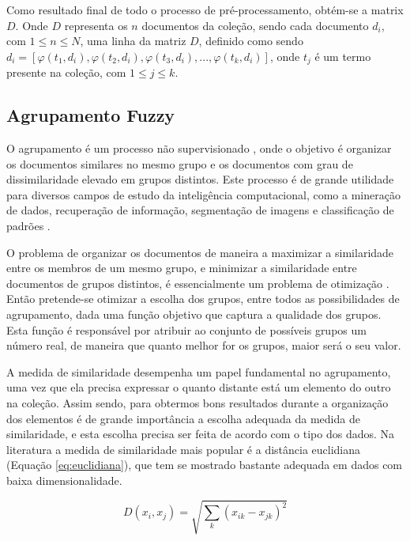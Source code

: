 Como resultado final de todo o processo de pré-processamento, obtém-se a matrix $D$. Onde $D$ 
representa os $n$ documentos da coleção, sendo cada documento $d_{i}$, com $1 \leq n \leq N$, 
uma linha da matriz $D$, definido como sendo 
$ d_{i} = [\varphi(t_{1},d_{i}),\varphi(t_{2},d_{i}),\varphi(t_{3},d_{i}),...,\varphi(t_{k},d_{i})] $,
onde $t_{j}$ é um termo presente na coleção, com $1 \leq j \leq k$.

\subsection{Agrupamento Fuzzy}
O agrupamento é um processo não supervisionado \cite{Feldman2007}, onde o objetivo é organizar os 
documentos similares no mesmo grupo e os documentos com grau de dissimilaridade elevado em 
grupos distintos\cite{Nogueira2013}\cite{Feldman2007}. Este processo é de grande 
utilidade para diversos campos de estudo da inteligência computacional, 
como a mineração de dados, recuperação de informação, 
segmentação de imagens e classificação de padrões \cite{Feldman2007}.

O problema de organizar os documentos de maneira a maximizar a similaridade entre os membros
de um mesmo grupo, e minimizar a similaridade entre documentos de grupos distintos, é 
essencialmente um problema de otimização \cite{Feldman2007}. 
Então pretende-se otimizar a escolha dos grupos, entre todos as possibilidades de agrupamento, 
dada uma função objetivo que captura a qualidade dos grupos. Esta função
é responsável por atribuir ao conjunto de possíveis grupos um número real, de maneira que quanto 
melhor for os grupos, maior será o seu valor\cite{Feldman2007}.

A medida de similaridade desempenha um papel fundamental no agrupamento, uma vez que ela 
precisa expressar o quanto distante está um elemento do outro na coleção. Assim sendo, para 
obtermos bons resultados durante a organização dos elementos é de grande importância a escolha
adequada da medida de similaridade, e esta escolha precisa ser feita de acordo com o tipo dos dados.
Na literatura a medida de similaridade mais popular\cite{Feldman2007} é a distância 
euclidiana (Equação \ref{eq:euclidiana}),
que tem se mostrado bastante adequada em dados com baixa dimensionalidade.

\begin{equation}
D(x_{i}, x_{j}) = \sqrt{\sum_k{(x_{ik}-x_{jk})^2}}
\label{eq:euclidiana}
\end{equation}

